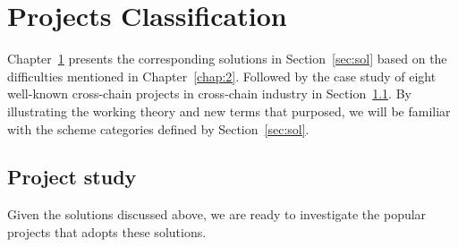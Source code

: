 \chapter{Projects Classification} 
\label{chap:3}
\noindent Chapter~\ref{chap:3} presents the corresponding solutions in Section~\ref{sec:sol} based on the difficulties mentioned in Chapter~\ref{chap:2}. Followed by the case study of eight well-known cross-chain projects in cross-chain industry in Section~\ref{sec:ps}. By illustrating the working theory and new terms that purposed,  we will be familiar with the scheme categories defined by Section~\ref{sec:sol}.


\section{Project study}
\label{sec:ps}
\noindent Given the solutions discussed above, we are ready to investigate the popular projects that adopts these solutions.

